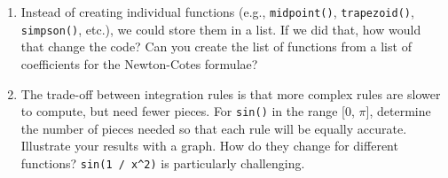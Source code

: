 \begin{enumerate}
\def\labelenumi{\arabic{enumi}.}
\item
  Instead of creating individual functions (e.g., \texttt{midpoint()},
  \texttt{trapezoid()}, \texttt{simpson()}, etc.), we could store them
  in a list. If we did that, how would that change the code? Can you
  create the list of functions from a list of coefficients for the
  Newton-Cotes formulae?
\item
  The trade-off between integration rules is that more complex rules are
  slower to compute, but need fewer pieces. For \texttt{sin()} in the
  range {[}0, $\pi${]}, determine the number of pieces needed so that
  each rule will be equally accurate. Illustrate your results with a
  graph. How do they change for different functions?
  \texttt{sin(1 / x\^{}2)} is particularly challenging.
\end{enumerate}
